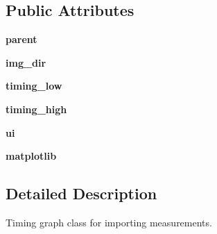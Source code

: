 \subsection*{Public Attributes}
\begin{DoxyCompactItemize}
\item 
\hypertarget{classDialogs_1_1ImportTimingGraphDialog_1_1ImportTimingGraphDialog_a6315dcc4b9b8223cd76880c35b883f20}{{\bfseries parent}}\label{classDialogs_1_1ImportTimingGraphDialog_1_1ImportTimingGraphDialog_a6315dcc4b9b8223cd76880c35b883f20}

\item 
\hypertarget{classDialogs_1_1ImportTimingGraphDialog_1_1ImportTimingGraphDialog_a94bb52491abbb58265853748a52c0f94}{{\bfseries img\-\_\-dir}}\label{classDialogs_1_1ImportTimingGraphDialog_1_1ImportTimingGraphDialog_a94bb52491abbb58265853748a52c0f94}

\item 
\hypertarget{classDialogs_1_1ImportTimingGraphDialog_1_1ImportTimingGraphDialog_a522927adb0697c9030a3a36a6b21c43a}{{\bfseries timing\-\_\-low}}\label{classDialogs_1_1ImportTimingGraphDialog_1_1ImportTimingGraphDialog_a522927adb0697c9030a3a36a6b21c43a}

\item 
\hypertarget{classDialogs_1_1ImportTimingGraphDialog_1_1ImportTimingGraphDialog_ab59f265f1bcc8f6afcab45bca08bd50f}{{\bfseries timing\-\_\-high}}\label{classDialogs_1_1ImportTimingGraphDialog_1_1ImportTimingGraphDialog_ab59f265f1bcc8f6afcab45bca08bd50f}

\item 
\hypertarget{classDialogs_1_1ImportTimingGraphDialog_1_1ImportTimingGraphDialog_ad79b95115e8feecacd7435e22ba117b3}{{\bfseries ui}}\label{classDialogs_1_1ImportTimingGraphDialog_1_1ImportTimingGraphDialog_ad79b95115e8feecacd7435e22ba117b3}

\item 
\hypertarget{classDialogs_1_1ImportTimingGraphDialog_1_1ImportTimingGraphDialog_a0de2d35c5932832c49d1f6dff2e0b122}{{\bfseries matplotlib}}\label{classDialogs_1_1ImportTimingGraphDialog_1_1ImportTimingGraphDialog_a0de2d35c5932832c49d1f6dff2e0b122}

\end{DoxyCompactItemize}


\subsection{Detailed Description}
\begin{DoxyVerb}Timing graph class for importing measurements.
\end{DoxyVerb}
 

